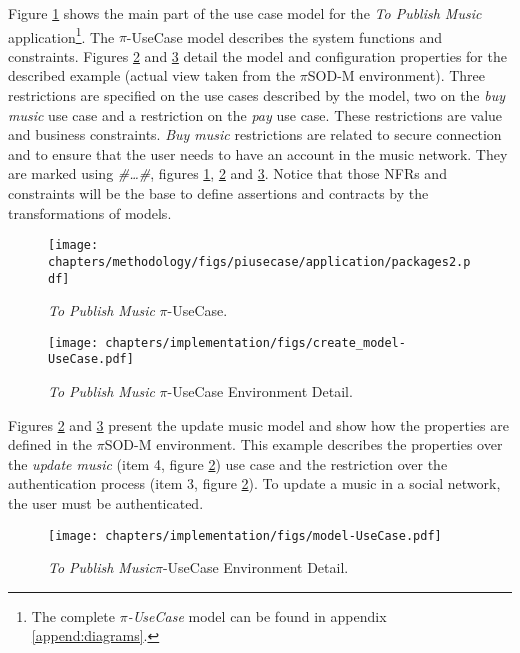  
Figure \ref{fig:publishMusic_usecase} shows the main part of the use case model
for the \textit{To Publish Music} application\footnote{The complete
\textit{$\pi$-UseCase} model can be found in appendix \ref{append:diagrams}.}.
The $\pi$-UseCase model describes the system functions and constraints. Figures
\ref{fig:toolpublishMusic_usecase} and \ref{fig:toolpublishMusic_usecase2}
detail the model and configuration properties for the described example
(actual view taken from the $\pi$SOD-M environment).
Three restrictions are specified on the use cases described by the
model, two on the \textit{buy music} use case and a restriction on the
\textit{pay} use case. These restrictions are value and business constraints.
\textit{Buy music} restrictions are related to secure connection and to
ensure that the user needs to have an account in the music network. They are
marked using \textit{\#\ldots\#}, figures \ref{fig:publishMusic_usecase},
\ref{fig:toolpublishMusic_usecase} and \ref{fig:toolpublishMusic_usecase2}.
Notice that those NFRs and constraints will be the base to define assertions and
contracts by the transformations of models.



\begin{figure}[ht!]    
\centering
\texttt{[image: chapters/methodology/figs/piusecase/application/packages2.pdf]}
\caption{\textit{To Publish Music} $\pi$-UseCase.}
\label{fig:publishMusic_usecase}
\end{figure} 


\begin{figure}[ht!]
\centering
\texttt{[image: chapters/implementation/figs/create\_model-UseCase.pdf]}
\caption{\textit{To Publish Music} $\pi$-UseCase Environment Detail.}
\label{fig:toolpublishMusic_usecase}
\end{figure}

Figures \ref{fig:toolpublishMusic_usecase} and
\ref{fig:toolpublishMusic_usecase2} present the update music model and show how
the properties are defined in the $\pi$SOD-M environment. This example describes
the properties over the \textit{update music} (item 4, figure
\ref{fig:toolpublishMusic_usecase}) use case and the restriction over the
authentication process (item 3, figure \ref{fig:toolpublishMusic_usecase}). To
update a music in a social network, the user must be authenticated.

\begin{figure}[ht!]
\centering
\texttt{[image: chapters/implementation/figs/model-UseCase.pdf]}
\caption{\textit{To Publish Music}$\pi$-UseCase Environment Detail.}
\label{fig:toolpublishMusic_usecase2}
\end{figure}


